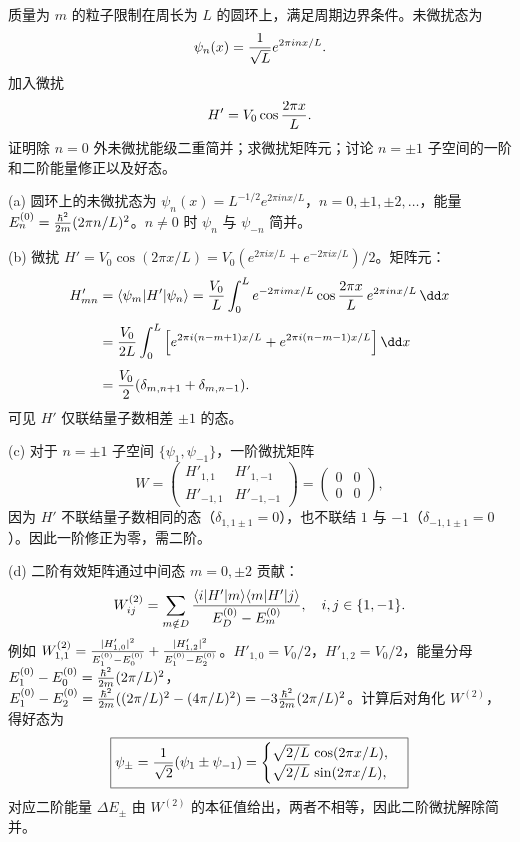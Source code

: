 \begin{question}
质量为 $m$ 的粒子限制在周长为 $L$ 的圆环上，满足周期边界条件。未微扰态为
\[
\psi_n(x)={1\over\sqrt L}e^{2\pi i n x/L}.
\]
加入微扰
\[
H'=V_0\cos{2\pi x\over L}.
\]
证明除 $n=0$ 外未微扰能级二重简并；求微扰矩阵元；讨论 $n=\pm1$ 子空间的一阶和二阶能量修正以及好态。
\end{question}
\begin{solution}
(a) 圆环上的未微扰态为 $\psi_n(x)=L^{-1/2}e^{2\pi i n x/L}$，$n=0,\pm1,\pm2,\dots$，能量 $E_n^{(0)}={\hbar^2\over2m}(2\pi n/L)^2$。$n\ne0$ 时 $\psi_n$ 与 $\psi_{-n}$ 简并。

(b) 微扰 $H'=V_0\cos(2\pi x/L)=V_0(e^{2\pi i x/L}+e^{-2\pi i x/L})/2$。矩阵元：
\[
\begin{aligned}
H'_{mn} &= \langle\psi_m|H'|\psi_n\rangle
= {V_0\over L}\int_0^L e^{-2\pi i mx/L}\cos{2\pi x\over L}\,e^{2\pi i nx/L}\,\dd x \\[4pt]
&= {V_0\over2L}\int_0^L \left[e^{2\pi i (n-m+1)x/L}+e^{2\pi i (n-m-1)x/L}\right]\dd x \\[4pt]
&= {V_0\over2}(\delta_{m,n+1}+\delta_{m,n-1}).
\end{aligned}
\]
可见 $H'$ 仅联结量子数相差 $\pm1$ 的态。

(c) 对于 $n=\pm1$ 子空间 $\{\psi_1,\psi_{-1}\}$，一阶微扰矩阵
\[
W = \begin{pmatrix}
H'_{1,1} & H'_{1,-1}\\
H'_{-1,1} & H'_{-1,-1}
\end{pmatrix}
= \begin{pmatrix}
0 & 0\\
0 & 0
\end{pmatrix},
\]
因为 $H'$ 不联结量子数相同的态（$\delta_{1,1\pm1}=0$），也不联结 $1$ 与 $-1$（$\delta_{-1,1\pm1}=0$）。因此一阶修正为零，需二阶。

(d) 二阶有效矩阵通过中间态 $m=0,\pm2$ 贡献：
\[
W^{(2)}_{ij} = \sum_{m\notin D} {\langle i|H'|m\rangle\langle m|H'|j\rangle\over E_D^{(0)}-E_m^{(0)}},\quad i,j\in\{1,-1\}.
\]
例如 $W^{(2)}_{1,1} = {|H'_{1,0}|^2\over E_1^{(0)}-E_0^{(0)}} + {|H'_{1,2}|^2\over E_1^{(0)}-E_2^{(0)}}$。$H'_{1,0}=V_0/2$，$H'_{1,2}=V_0/2$，能量分母 $E_1^{(0)}-E_0^{(0)}={\hbar^2\over2m}(2\pi/L)^2$，$E_1^{(0)}-E_2^{(0)}={\hbar^2\over2m}((2\pi/L)^2-(4\pi/L)^2)=-3{\hbar^2\over2m}(2\pi/L)^2$。计算后对角化 $W^{(2)}$，得好态为
\[
\boxed{\psi_\pm = {1\over\sqrt2}(\psi_1\pm\psi_{-1}) = \begin{cases}
\sqrt{2/L}\,\cos(2\pi x/L),\\
\sqrt{2/L}\,\sin(2\pi x/L),
\end{cases}}
\]
对应二阶能量 $\Delta E_\pm$ 由 $W^{(2)}$ 的本征值给出，两者不相等，因此二阶微扰解除简并。
\end{solution}

